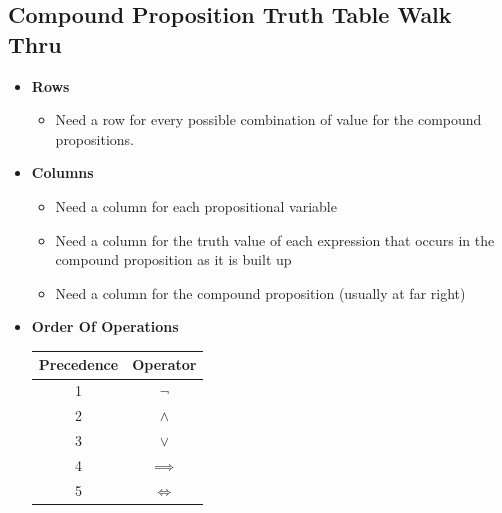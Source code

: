 \documentclass{article}
\begin{document}
\subsection{Compound Proposition Truth Table Walk Thru}
\begin{itemize}
	\item \textbf{Rows}
		\begin{itemize}
			\item Need a row for every possible combination of value for the compound propositions.
		\end{itemize}
	\item \textbf{Columns}
		\begin{itemize}
			\item Need a column for each propositional variable
			\item Need a column for the truth value of each expression that occurs in the compound proposition as it is built up
			\item Need a column for the compound proposition (usually at far right)
		\end{itemize}		
	\item \textbf{Order Of Operations} \\
		\begin{tabular}{|c|c|}
			\hline
			Precedence & Operator\\
			\hline
			1 & $ \neg $ \\
			2 & $ \land $ \\
			3 & $ \lor $ \\
			4 & $ \implies $ \\
			5 & $ \Longleftrightarrow $ \\
			\hline
		\end{tabular}
\end{itemize}
\end{document}
